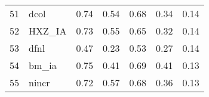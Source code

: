 \documentclass[12pt]{article}
\begin{document}
\begin{footnotesize}
\begin{longtable}{rl|c|c|c|c|c}
				51                   & dcol                        & 0.74                             & 0.54                                                                                          & 0.68                                                                                          & 0.34                                                                                          & 0.14                                                                                                   \\
				52                   & HXZ\_IA                     & 0.73                             & 0.55                                                                                          & 0.65                                                                                          & 0.32                                                                                          & 0.14                                                                                                   \\
				53                   & dfnl                        & 0.47                             & 0.23                                                                                          & 0.53                                                                                          & 0.27                                                                                          & 0.14                                                                                                   \\
				54                   & bm\_ia                      & 0.75                             & 0.41                                                                                          & 0.69                                                                                          & 0.41                                                                                          & 0.13                                                                                                   \\
				55                   & nincr                       & 0.72                             & 0.57                                                                                          & 0.68                                                                                          & 0.36                                                                                          & 0.13                                                                                                   \\

\end{longtable}
\end{footnotesize}
\end{document}
